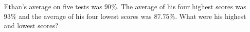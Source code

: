 Ethan's average on five tests was $90\%$. The average of his four highest scores was $93\%$ and the average of his four lowest scores was $87.75\%$. What were his highest and lowest scores?
